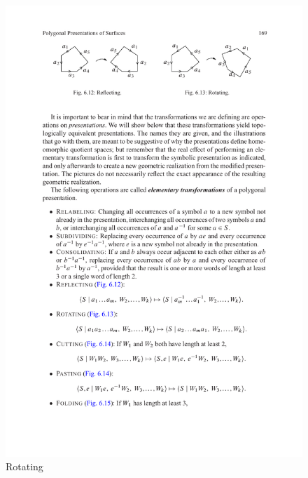\begin{figure}[htbp]
\begin{minipage}[b]{200pt}
\includegraphics{rotating.pdf}
\caption{Rotating}
\end{minipage}
\end{figure}

